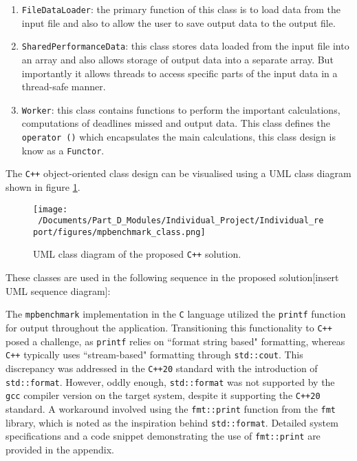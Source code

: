 \begin{enumerate}
	\item \texttt{FileDataLoader}: the primary function of this class is to load data from the input file and also to allow the user to save output data to the output file.
	\item \texttt{SharedPerformanceData}: this class stores data loaded from the input file into an array and also allows storage of output data into a separate array. But importantly it allows threads to access specific parts of the input data in a thread-safe manner. 
	\item \texttt{Worker}: this class contains functions to perform the important calculations, computations of deadlines missed and output data. This class defines the \texttt{operator ()} which encapsulates the main calculations, this class design is know as a \texttt{Functor}.
\end{enumerate}

The \texttt{C++} object-oriented class design can be visualised using a UML class diagram shown in figure \ref*{fig:mpbenchmark_UML_diagram}.

\begin{figure}[h] %
	\centering
	\texttt{[image: ~/Documents/Part\_D\_Modules/Individual\_Project/Individual\_report/figures/mpbenchmark\_class.png]} %
	\caption{UML class diagram of the proposed \texttt{C++} solution.}
	\label{fig:mpbenchmark_UML_diagram} %
\end{figure}

These classes are used in the following sequence in the proposed solution[insert UML sequence diagram]:

The \texttt{mpbenchmark} implementation in the \texttt{C} language utilized the \texttt{printf} function for output throughout the application. Transitioning this functionality to \texttt{C++} posed a challenge, as \texttt{printf} relies on ``format string based" formatting, whereas \texttt{C++} typically uses ``stream-based" formatting through \texttt{std::cout}. This discrepancy was addressed in the \texttt{C++20} standard with the introduction of \texttt{std::format}. However, oddly enough, \texttt{std::format} was not supported by the \texttt{gcc} compiler version on the target system, despite it supporting the \texttt{C++20} standard\cite{std_format_gcc_compiler_version}. A workaround involved using the \texttt{fmt::print} function from the \texttt{fmt} library, which is noted as the inspiration behind \texttt{std::format}\cite{fmt_printing_library}. Detailed system specifications and a code snippet demonstrating the use of \texttt{fmt::print} are provided in the appendix.

